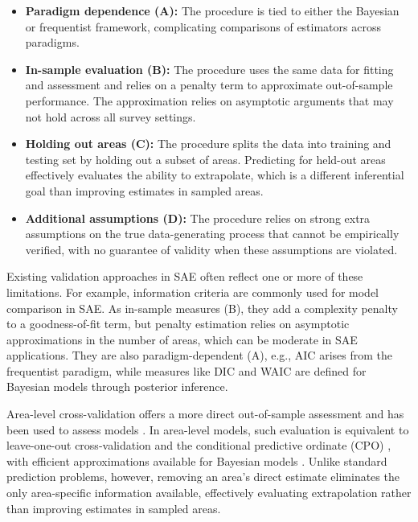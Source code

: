 \documentclass[11pt]{article}
\theoremstyle{plain}
\theoremstyle{definition}
\theoremstyle{remark}
\begin{document}
\begin{itemize}
    \item \textbf{Paradigm dependence (A):} The procedure is tied to either the Bayesian or frequentist framework, complicating comparisons of estimators across paradigms.

    \item \textbf{In-sample evaluation (B):} The procedure uses the same data for fitting and assessment and relies on a penalty term to approximate out-of-sample performance. The approximation relies on asymptotic arguments that may not hold across all survey settings.

    \item \textbf{Holding out areas (C):} The procedure splits the data into training and testing set by holding out a subset of areas. Predicting for held-out areas effectively evaluates the ability to extrapolate, which is a different inferential goal than improving estimates in sampled areas.

    \item \textbf{Additional assumptions (D):} The procedure relies on strong extra assumptions on the true data-generating process that cannot be empirically verified, with no guarantee of validity when these assumptions are violated. %
\end{itemize}

Existing validation approaches in SAE often reflect one or more of these limitations. For example, information criteria are commonly used for model comparison in SAE. As in-sample measures (B), they add a complexity penalty to a goodness-of-fit term, but penalty estimation relies on asymptotic approximations in the number of areas, which can be moderate in SAE applications. They are also paradigm-dependent (A), e.g., AIC \citep{akaike_new_1974} arises from the frequentist paradigm, while measures like DIC \citep{spiegelhalter_bayesian_2002} and WAIC \citep{watanabe_asymptotic_2010} are defined for Bayesian models through posterior inference.


Area-level cross-validation offers a more direct out-of-sample assessment and has been used to assess models \citep{michal_model-based_2024}.  In area-level models, such evaluation is equivalent to leave-one-out cross-validation and the conditional predictive ordinate (CPO)
\citep{stern_posterior_2000, marshall_approximate_2003}, with efficient approximations available for Bayesian models \citep{vehtari_practical_2017}.
Unlike standard prediction problems, however, removing an area's direct estimate eliminates the only area-specific information available, effectively evaluating extrapolation rather than improving estimates in sampled areas.
\end{document}
